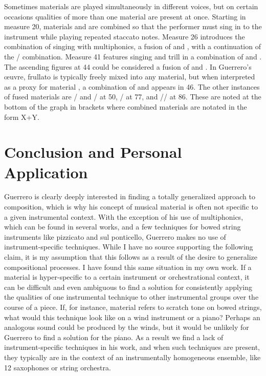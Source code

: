 Sometimes materials are played simultaneously in different voices, but on certain occasions qualities of more than one material are present at once. Starting in measure 20, materials  and  are combined so that the performer must sing in to the instrument while playing repeated staccato notes. Measure 26 introduces the combination of singing with multiphonics, a fusion of  and , with a continuation of the / combination. Measure 41 features singing and trill in a combination of  and . The ascending figures at 44 could be considered a fusion of  and . In Guerrero's œuvre, frullato is typically freely mixed into any material, but when interpreted as a proxy for material , a combination of  and  appears in 46. The other instances of fused materials are / and / at 50, / at 77, and // at 86. These are noted at the bottom of the graph in brackets where combined materials are notated in the form X+Y.

\section{Conclusion and Personal Application}

Guerrero is clearly deeply interested in finding a totally generalized approach to composition, which is why his concept of musical material is often not specific to a given instrumental context. With the exception of his use of multiphonics, which can be found in several works, and a few techniques for bowed string instruments like pizzicato and sul ponticello, Guerrero makes no use of instrument-specific techniques. While I have no source supporting the following claim, it is my assumption that this follows as a result of the desire to generalize compositional processes. I have found this same situation in my own work. If a material is hyper-specific to a certain instrument or orchestrational context, it can be difficult and even ambiguous to find a solution for consistently applying the qualities of one instrumental technique to other instrumental groups over the course of a piece. If, for instance, material  refers to scratch tone on bowed strings, what would this technique look like on a wind instrument or a piano? Perhaps an analogous sound could be produced by the winds, but it would be unlikely for Guerrero to find a solution for the piano. As a result we find a lack of instrument-specific techniques in his work, and when such techniques are present, they typically are in the context of an instrumentally homogeneous ensemble, like 12 saxophones or string orchestra.

